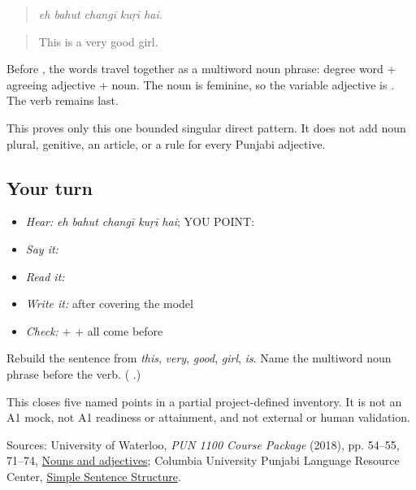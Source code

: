 \begin{grammarlens}[title={Grammar Lens: the words work as one noun phrase}]
\begin{quote}
\textbf{    }
\end{quote}

\begin{quote}
\emph{eh bahut changī kuṛī hai.}
\end{quote}

\begin{quote}
This is a very good girl.
\end{quote}

Before \textbf{}, the words \textbf{  } travel together as a multiword noun phrase: degree word + agreeing adjective + noun. The noun is feminine, so the variable adjective is \textbf{}. The verb remains last.

This proves only this one bounded singular direct pattern. It does not add noun plural, genitive, an article, or a rule for every Punjabi adjective.
\end{grammarlens}

\subsection*{Your turn}
\begin{itemize}
\raggedright
  \item \emph{Hear:} \emph{eh bahut changī kuṛī hai}; YOU POINT: \textbf{    }
  \item \emph{Say it:} \textbf{    }
  \item \emph{Read it:} \textbf{    }
  \item \emph{Write it:} \textbf{    } after covering the model
  \item \emph{Check:} \textbf{} + \textbf{} + \textbf{} all come before \textbf{}
\end{itemize}

\begin{tcolorbox}[breakable,colback=teal!4,colframe=teal!35!black,title={Before you move on}]
Rebuild the sentence from \emph{this}, \emph{very}, \emph{good}, \emph{girl}, \emph{is}. Name the multiword noun phrase before the verb. (\textbf{  }.)

This closes five named points in a partial project-defined inventory. It is not an A1 mock, not A1 readiness or attainment, and not external or human validation.

Sources: University of Waterloo, \emph{PUN 1100 Course Package} (2018), pp. 54–55, 71–74, \href{https://openlibrary-repo.ecampusontario.ca/jspui/bitstream/123456789/492/2/2018Pun1100CoursePackage.pdf}{Nouns and adjectives}; Columbia University Punjabi Language Resource Center, \href{https://punjabi.lrc.columbia.edu/?page\_id=101}{Simple Sentence Structure}.
\end{tcolorbox}
